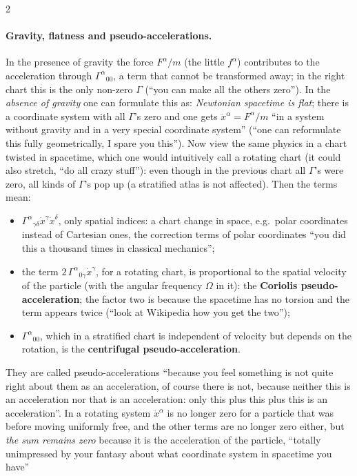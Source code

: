\begin{paracol}{2}
\paragraph{Gravity, flatness and pseudo-accelerations.} In the presence of gravity the force $F^\alpha/m$ (the little $f^\alpha$) contributes to the acceleration through $\Gamma^\alpha{}_{00}$, a term that cannot be transformed away; in the right chart this is the only non-zero $\Gamma$ (``you can make all the others zero''). In the \emph{absence of gravity} one can formulate this as: \emph{Newtonian spacetime is flat}; there is a coordinate system with all $\Gamma$'s zero and one gets $\ddot x^\alpha=F^\alpha/m$ ``in a system without gravity and in a very special coordinate system'' (``one can reformulate this fully geometrically, I spare you this'').
Now view the same physics in a chart twisted in spacetime, which one would intuitively call a rotating chart (it could also stretch, ``do all crazy stuff''): even though in the previous chart all $\Gamma$'s were zero, all kinds of $\Gamma$'s pop up (a stratified atlas is not affected). Then the terms mean:
\begin{itemize}
  \item $\Gamma^\alpha{}_{\gamma\delta}\dot x^\gamma\dot x^\delta$, only spatial indices: a chart change in space, e.g.\ polar coordinates instead of Cartesian ones, the correction terms of polar coordinates ``you did this a thousand times in classical mechanics'';
  \item the term $2\,\Gamma^\alpha{}_{0\gamma}\dot x^\gamma$, for a rotating chart, is proportional to the spatial velocity of the particle (with the angular frequency $\Omega$ in it): the \textbf{Coriolis pseudo-acceleration}; the factor two is because the spacetime has no torsion and the term appears twice (``look at Wikipedia how you get the two'');
  \item $\Gamma^\alpha{}_{00}$, which in a stratified chart is independent of velocity but depends on the rotation, is the \textbf{centrifugal pseudo-acceleration}.
\end{itemize}
They are called pseudo-accelerations ``because you feel something is not quite right about them as an acceleration, of course there is not, because neither this is an acceleration nor that is an acceleration: only this plus this plus this is an acceleration''. In a rotating system $\ddot x^\alpha$ is no longer zero for a particle that was before moving uniformly free, and the other terms are no longer zero either, but \emph{the sum remains zero} because it is the acceleration of the particle, ``totally unimpressed by your fantasy about what coordinate system in spacetime you have''

\end{paracol}
